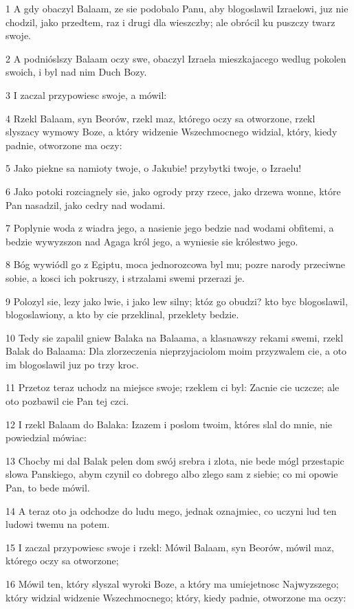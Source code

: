 \par 1 A gdy obaczyl Balaam, ze sie podobalo Panu, aby blogoslawil Izraelowi, juz nie chodzil, jako przedtem, raz i drugi dla wieszczby; ale obrócil ku puszczy twarz swoje.
\par 2 A podnióslszy Balaam oczy swe, obaczyl Izraela mieszkajacego wedlug pokolen swoich, i byl nad nim Duch Bozy.
\par 3 I zaczal przypowiesc swoje, a mówil:
\par 4 Rzekl Balaam, syn Beorów, rzekl maz, którego oczy sa otworzone, rzekl slyszacy wymowy Boze, a który widzenie Wszechmocnego widzial, który, kiedy padnie, otworzone ma oczy:
\par 5 Jako piekne sa namioty twoje, o Jakubie! przybytki twoje, o Izraelu!
\par 6 Jako potoki rozciagnely sie, jako ogrody przy rzece, jako drzewa wonne, które Pan nasadzil, jako cedry nad wodami.
\par 7 Poplynie woda z wiadra jego, a nasienie jego bedzie nad wodami obfitemi, a bedzie wywyzszon nad Agaga król jego, a wyniesie sie królestwo jego.
\par 8 Bóg wywiódl go z Egiptu, moca jednorozcowa byl mu; pozre narody przeciwne sobie, a kosci ich pokruszy, i strzalami swemi przerazi je.
\par 9 Polozyl sie, lezy jako lwie, i jako lew silny; któz go obudzi? kto byc blogoslawil, blogoslawiony, a kto by cie przeklinal, przeklety bedzie.
\par 10 Tedy sie zapalil gniew Balaka na Balaama, a klasnawszy rekami swemi, rzekl Balak do Balaama: Dla zlorzeczenia nieprzyjaciolom moim przyzwalem cie, a oto im blogoslawil juz po trzy kroc.
\par 11 Przetoz teraz uchodz na miejsce swoje; rzeklem ci byl: Zacnie cie uczcze; ale oto pozbawil cie Pan tej czci.
\par 12 I rzekl Balaam do Balaka: Izazem i poslom twoim, któres slal do mnie, nie powiedzial mówiac:
\par 13 Chocby mi dal Balak pelen dom swój srebra i zlota, nie bede mógl przestapic slowa Panskiego, abym czynil co dobrego albo zlego sam z siebie; co mi opowie Pan, to bede mówil.
\par 14 A teraz oto ja odchodze do ludu mego, jednak oznajmiec, co uczyni lud ten ludowi twemu na potem.
\par 15 I zaczal przypowiesc swoje i rzekl: Mówil Balaam, syn Beorów, mówil maz, którego oczy sa otworzone;
\par 16 Mówil ten, który slyszal wyroki Boze, a który ma umiejetnosc Najwyzszego; który widzial widzenie Wszechmocnego; który, kiedy padnie, otworzone ma oczy:
